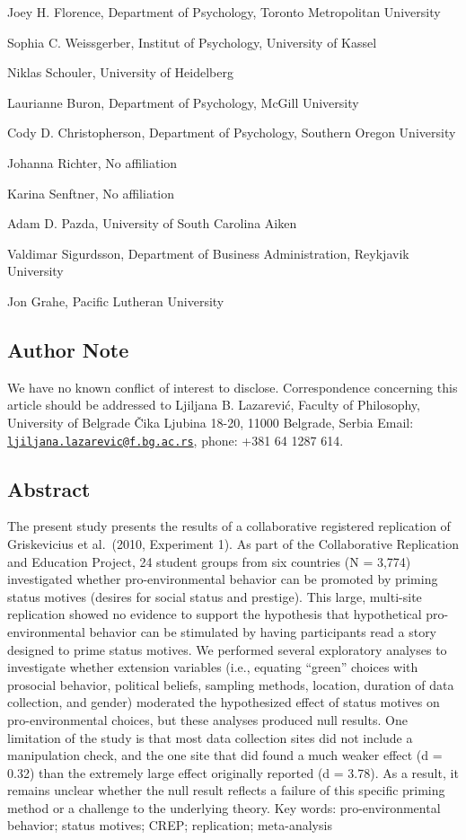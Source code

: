 \documentclass[
]{article}
\begin{document}
Joey H. Florence, Department of Psychology, Toronto Metropolitan
University

Sophia C. Weissgerber, Institut of Psychology, University of Kassel

Niklas Schouler, University of Heidelberg

Laurianne Buron, Department of Psychology, McGill University

Cody D. Christopherson, Department of Psychology, Southern Oregon
University

Johanna Richter, No affiliation

Karina Senftner, No affiliation

Adam D. Pazda, University of South Carolina Aiken

Valdimar Sigurdsson, Department of Business Administration, Reykjavik
University

Jon Grahe, Pacific Lutheran University

\subsection{Author Note}\label{author-note}

We have no known conflict of interest to disclose. Correspondence
concerning this article should be addressed to Ljiljana B. Lazarević,
Faculty of Philosophy, University of Belgrade Čika Ljubina 18-20, 11000
Belgrade, Serbia Email:
\href{mailto:ljiljana.lazarevic@f.bg.ac.rs}{\nolinkurl{ljiljana.lazarevic@f.bg.ac.rs}},
phone: +381 64 1287 614.

\newpage

\subsection{Abstract}\label{abstract}

The present study presents the results of a collaborative registered
replication of Griskevicius et al.~(2010, Experiment 1). As part of the
Collaborative Replication and Education Project, 24 student groups from
six countries (N = 3,774) investigated whether pro-environmental
behavior can be promoted by priming status motives (desires for social
status and prestige). This large, multi-site replication showed no
evidence to support the hypothesis that hypothetical pro-environmental
behavior can be stimulated by having participants read a story designed
to prime status motives. We performed several exploratory analyses to
investigate whether extension variables (i.e., equating ``green''
choices with prosocial behavior, political beliefs, sampling methods,
location, duration of data collection, and gender) moderated the
hypothesized effect of status motives on pro-environmental choices, but
these analyses produced null results. One limitation of the study is
that most data collection sites did not include a manipulation check,
and the one site that did found a much weaker effect (d = 0.32) than the
extremely large effect originally reported (d = 3.78). As a result, it
remains unclear whether the null result reflects a failure of this
specific priming method or a challenge to the underlying theory. Key
words: pro-environmental behavior; status motives; CREP; replication;
meta-analysis
\end{document}
